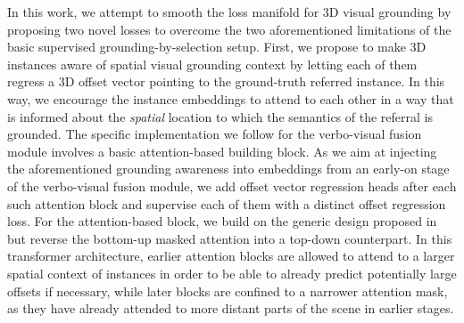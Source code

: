 \documentclass[10pt,twocolumn,letterpaper]{article}
\begin{document}
In this work, we attempt to smooth the loss manifold for 3D visual grounding by proposing two novel losses to overcome the two aforementioned limitations of the basic supervised grounding-by-selection setup. First, we propose to make 3D instances aware of spatial visual grounding context by letting each of them regress a 3D offset vector pointing to the ground-truth referred instance. In this way, we encourage the instance embeddings to attend to each other in a way that is informed about the \emph{spatial} location to which the semantics of the referral is grounded. The specific implementation we follow for the verbo-visual fusion module involves a basic attention-based building block. As we aim at injecting the aforementioned grounding awareness into embeddings from an early-on stage of the verbo-visual fusion module, we add offset vector regression heads after each such attention block and supervise each of them with a distinct offset regression loss. For the attention-based block, we build on the generic design proposed in~\cite{unal2023ways} but reverse the bottom-up masked attention into a top-down counterpart. In this transformer architecture, earlier attention blocks are allowed to attend to a larger spatial context of instances in order to be able to already predict potentially large offsets if necessary, while later blocks are confined to a narrower attention mask, as they have already attended to more distant parts of the scene in earlier stages.


\end{document}
